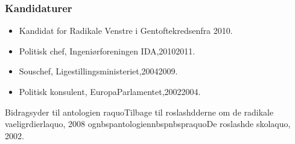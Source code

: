 \documentclass[11pt, a4paper]{awesome-cv}
\begin{document}
\begin{cvletter}
\subsubsection*{Kandidaturer}
\begin{itemize}
\item Kandidat for Radikale Venstre i Gentoftekredsenfra 2010.
\end{itemize}
\begin{itemize}
\item Politisk chef, Ingeniørforeningen IDA,20102011.
\item Souschef, Ligestillingsministeriet,20042009.
\item Politisk konsulent, EuropaParlamentet,20022004.
\end{itemize}
Bidragsyder til antologien raquoTilbage til roslashdderne  om de radikale vaeligrdierlaquo, 2008 ognbspantologiennbspnbspraquoDe roslashde skolaquo, 2002.

\end{cvletter}
\end{document}
